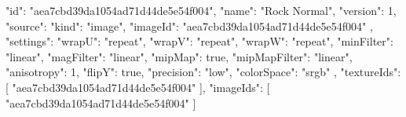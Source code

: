 {
  "id": "aea7cbd39da1054ad71d44de5e54f004",
  "name": "Rock Normal",
  "version": 1,
  "source": {
    "kind": "image",
    "imageId": "aea7cbd39da1054ad71d44de5e54f004"
  },
  "settings": {
    "wrapU": "repeat",
    "wrapV": "repeat",
    "wrapW": "repeat",
    "minFilter": "linear",
    "magFilter": "linear",
    "mipMap": true,
    "mipMapFilter": "linear",
    "anisotropy": 1,
    "flipY": true,
    "precision": "low",
    "colorSpace": "srgb"
  },
  "textureIds": [
    "aea7cbd39da1054ad71d44de5e54f004"
  ],
  "imageIds": [
    "aea7cbd39da1054ad71d44de5e54f004"
  ]
}
